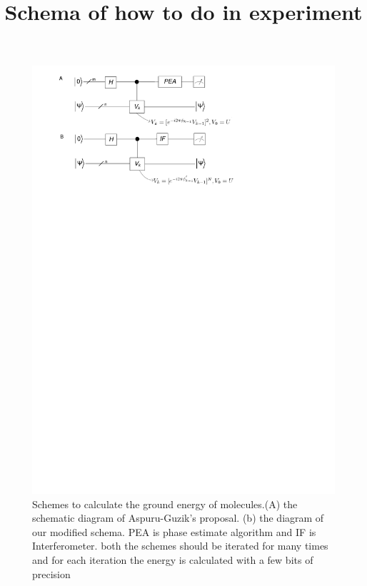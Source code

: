 \documentclass[twocolumn,twoside,10pt,superscriptaddress,prl]{revtex4}
\begin{document}
\title{Schema of how to do in experiment}


\maketitle

\begin{figure}[htb]
\begin{center}
\includegraphics[width= 0.99\columnwidth]{demo_circuit}
\end{center}
\caption{Schemes to calculate the ground energy of molecules.(A) the
schematic diagram of Aspuru-Guzik's proposal. (b) the diagram of our
modified schema. PEA is phase estimate algorithm and IF is
Interferometer. both the schemes should be iterated for many times
and for each iteration the energy is calculated with a few bits of
precision} \label{Sim}\label{circuit1}
\end{figure}
\end{document}
